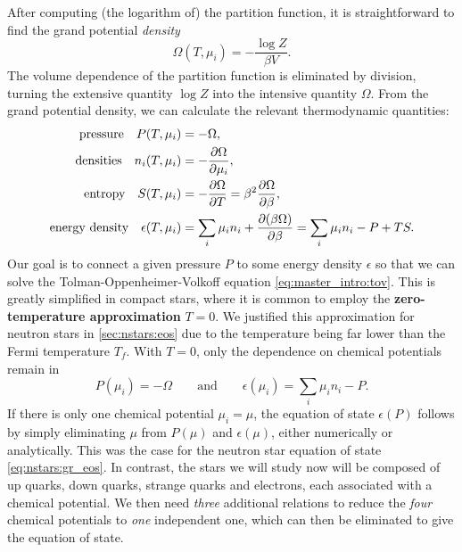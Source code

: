 After computing (the logarithm of) the partition function, it is straightforward to find the grand potential \emph{density}
\begin{equation}
	\Omega(T, \mu_i) = -\frac{\log Z}{\beta V}.
\label{eq:master_intro:grand_potential}
\end{equation}
The volume dependence of the partition function is eliminated by division, turning the extensive quantity $\log Z$ into the intensive quantity $\Omega$.
From the grand potential density, we can calculate the relevant thermodynamic quantities:
\begin{subequations}
\begin{align}
	\text{pressure} \quad P(T, \mu_i) &= -\Omega, \label{eq:master_intro:pressure} \\
	\text{densities} \quad n_i(T, \mu_i) &= -\pdv{\Omega}{\mu_i}, \label{eq:master_intro:densities} \\
	\text{entropy} \quad S(T, \mu_i) &= -\pdv{\Omega}{T} = \beta^2 \pdv{\Omega}{\beta}, \label{eq:master_intro:entropy} \\
	\text{energy density} \quad \epsilon(T, \mu_i) &= \sum_i \mu_i n_i + \pdv{(\beta \Omega)}{\beta} = \sum_i \mu_i n_i - P + T S. \label{eq:master_intro:energy_density}
\end{align}
\end{subequations}
Our goal is to connect a given pressure $P$ to some energy density $\epsilon$ so that we can solve the Tolman-Oppenheimer-Volkoff equation \eqref{eq:master_intro:tov}.
This is greatly simplified in compact stars, where it is common to employ the \textbf{zero-temperature approximation} $T=0$.
We justified this approximation for neutron stars in \cref{sec:nstars:eos} due to the temperature being far lower than the Fermi temperature $T_f$.
With $T = 0$, only the dependence on chemical potentials remain in
\begin{equation}
	P(\mu_i) = -\Omega
	\qquad \text{and} \qquad
	\epsilon(\mu_i) = \sum_i \mu_i n_i - P.
\end{equation}
If there is only one chemical potential $\mu_i = \mu$,
the equation of state $\epsilon(P)$ follows by simply eliminating $\mu$ from $P(\mu)$ and $\epsilon(\mu)$, either numerically or analytically.
This was the case for the neutron star equation of state \eqref{eq:nstars:gr_eos}.
In contrast, the stars we will study now will be composed of up quarks, down quarks, strange quarks and electrons, each associated with a chemical potential.
We then need \emph{three} additional relations to reduce the \emph{four} chemical potentials to \emph{one} independent one, which can then be eliminated to give the equation of state.

